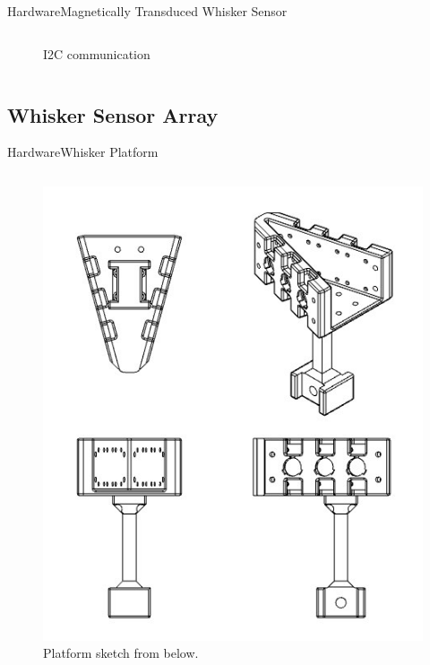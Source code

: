 \documentclass[AIRbeamer
,optEnglish
,optBiber
,optBibstyleAlphabetic
,optBeamerClassicFormat%
]{AIRlatex}
\begin{document}
\begin{frame}{Hardware}{Magnetically Transduced Whisker Sensor}
\begin{columns}[T,onlytextwidth]
\begin{column}[T]{0.6\textwidth}
\begin{figure}[H]
                    \caption{I2C communication}
                \end{figure}
            \end{column}
        \end{columns}
    \end{frame}

    \subsection{Whisker Sensor Array}
    \begin{frame}[c]{Hardware}{Whisker Platform}
        \begin{column}[T]{0.5\textwidth}
            \begin{figure}[H]
                \centering
                \includegraphics[height=0.7\textheight]{figures/platform-sketch}
                \caption{Platform sketch from below.}
            \end{figure}
        \end{column}
        \begin{column}[T]{0.5\textwidth}
            \begin{figure}[H]
                \centering

\end{figure}
\end{column}
\end{frame}
\end{document}
